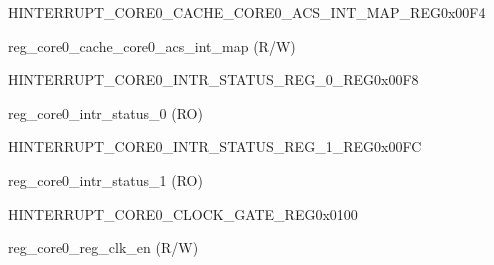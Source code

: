\begin{register}{H}{INTERRUPT\_CORE0\_CACHE\_CORE0\_ACS\_INT\_MAP\_REG}{0x00F4}\label{regdesc:INTERRUPTCORE0CACHECORE0ACSINTMAPREG}
%
%
\regnewline%
\begin{regdesc}\begin{reglist}
\label{fielddesc:INTERRUPTCORE0CACHECORE0ACSINTMAP}\item [INTERRUPT\_CORE0\_CACHE\_CORE0\_ACS\_INT\_MAP] reg\_core0\_cache\_core0\_acs\_int\_map (R/W)
\end{reglist}\end{regdesc}
\end{register}


\begin{register}{H}{INTERRUPT\_CORE0\_INTR\_STATUS\_REG\_0\_REG}{0x00F8}\label{regdesc:INTERRUPTCORE0INTRSTATUSREG0REG}
%
\regnewline%
\begin{regdesc}\begin{reglist}
\label{fielddesc:INTERRUPTCORE0INTRSTATUS0}\item [INTERRUPT\_CORE0\_INTR\_STATUS\_0] reg\_core0\_intr\_status\_0 (RO)
\end{reglist}\end{regdesc}
\end{register}


\begin{register}{H}{INTERRUPT\_CORE0\_INTR\_STATUS\_REG\_1\_REG}{0x00FC}\label{regdesc:INTERRUPTCORE0INTRSTATUSREG1REG}
%
\regnewline%
\begin{regdesc}\begin{reglist}
\label{fielddesc:INTERRUPTCORE0INTRSTATUS1}\item [INTERRUPT\_CORE0\_INTR\_STATUS\_1] reg\_core0\_intr\_status\_1 (RO)
\end{reglist}\end{regdesc}
\end{register}


\begin{register}{H}{INTERRUPT\_CORE0\_CLOCK\_GATE\_REG}{0x0100}\label{regdesc:INTERRUPTCORE0CLOCKGATEREG}
%
%
\regnewline%
\begin{regdesc}\begin{reglist}
\label{fielddesc:INTERRUPTCORE0REGCLKEN}\item [INTERRUPT\_CORE0\_REG\_CLK\_EN] reg\_core0\_reg\_clk\_en (R/W)
\end{reglist}\end{regdesc}
\end{register}


